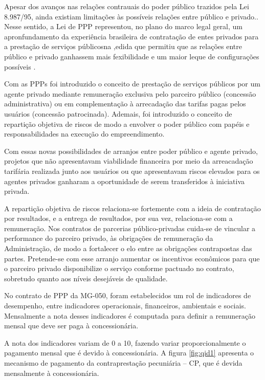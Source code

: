 \documentclass[
	12pt,				%
	openright,			%
	twoside,			%
	a4paper,			%
	english,			%
	french,				%
	spanish,			%
	brazil				%
	]{abntex2}
\begin{document}
Apesar dos avanços nas relações contrauais do poder público trazidos pela Lei 8.987/95, ainda existiam limitações às possíveis relações entre público e privado.. Nesse sentido, a Lei de PPP representou, no plano do marco legal geral, um apronfundamento da experiência brasileira de contratação de entes privados para a prestação de serviços públicosna ,edida que permitiu que as relações entre público e privado ganhassem mais fexibilidade e um maior leque de configurações possíveis \cite{ribeiroprado2010}.

Com as PPPs foi introduzido o conceito de prestação de serviços públicos por um agente privado mediante remuneração exclusiva pelo parceiro público (concessão administrativa) ou em complementação à arrecadação das tarifas pagas pelos usuários (concessão patrocinada). Ademais, foi introduzido o conceito de repartição objetiva de riscos de modo a envolver o poder público com papéis e responsabilidades na execução do empreendimento.

Com essas novas possibilidades de arranjos entre poder público e agente privado, projetos que não apresentavam viabilidade financeira por meio da arreacadação tarifária realizada junto aos usuários ou que apresentavam riscos elevados para os agentes privados ganharam a oportunidade de serem transferidos à iniciativa privada.

A repartição objetiva de riscos relaciona-se fortemente com a ideia de contratação por resultados, e a entrega de resultados, por sua vez, relaciona-se com a remuneração. Nos contratos de parcerias público-privadas cuida-se de vincular a performance do parceiro privado, às obrigações de remuneração da Administração, de modo a fortalecer o elo entre as obrigações contrapostas das partes. Pretende-se com esse arranjo aumentar os incentivos econômicos para que o parceiro privado disponibilize o serviço conforme pactuado no contrato, sobretudo quanto aos níveis desejáveis de qualidade. 

No contrato de PPP da MG-050, foram estabelecidos um rol de indicadores de desempenho, entre indicadores operacionais, financeiros, ambientais e sociais. Mensalmente a nota desses indicadores é computada para definir a remuneração mensal que deve ser paga à concessionária.

A nota dos indicadores variam de 0 a 10, fazendo variar proporcionalmente o pagamento mensal que é devido à concessionária. A figura \ref{fig:qid1} apresenta o mecanismo de pagamento da contraprestação pecuniária – CP, que é devida mensalmente à concessionária.
\end{document}
